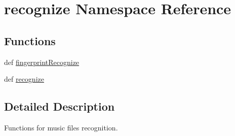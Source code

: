 \hypertarget{namespacerecognize}{\section{recognize Namespace Reference}
\label{namespacerecognize}
}
\subsection*{Functions}
\begin{DoxyCompactItemize}
\item 
def \hyperlink{namespacerecognize_a61509c867407ec3f7533ed5aa3a6a3d4}{fingerprint\-Recognize}
\item 
def \hyperlink{namespacerecognize_a1aaeb8ac53f078425fc2fb10f222b92c}{recognize}
\end{DoxyCompactItemize}


\subsection{Detailed Description}
\begin{DoxyVerb}Functions for music files recognition.
\end{DoxyVerb}
 

